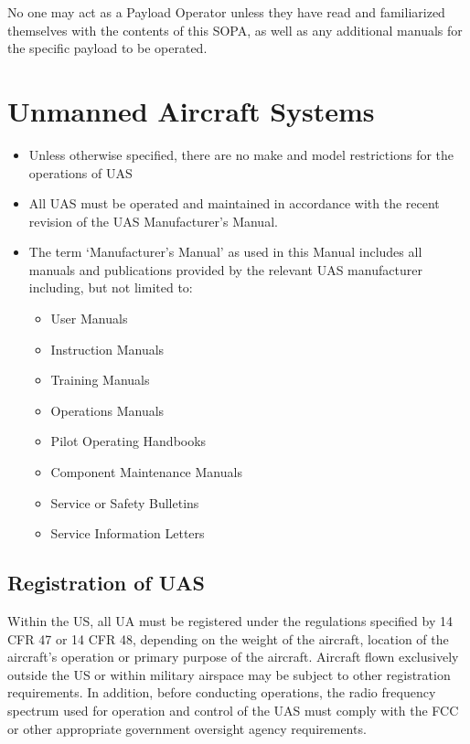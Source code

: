 \documentclass[
]{book}
\providecommand{\tightlist}{%
  \setlength{\itemsep}{0pt}\setlength{\parskip}{0pt}}
\begin{document}
No one may act as a Payload Operator unless they have read and familiarized themselves with the contents of this SOPA, as well as any additional manuals for the specific payload to be operated.

\chapter{Unmanned Aircraft Systems}\label{ch-UAS}

\begin{itemize}
\item
  Unless otherwise specified, there are no make and model restrictions for the operations of UAS
\item
  All UAS must be operated and maintained in accordance with the recent revision of the UAS Manufacturer's Manual.
\item
  The term `Manufacturer's Manual' as used in this Manual includes all manuals and publications provided by the relevant UAS manufacturer including, but not limited to:

  \begin{itemize}
  \tightlist
  \item
    User Manuals
  \item
    Instruction Manuals
  \item
    Training Manuals
  \item
    Operations Manuals
  \item
    Pilot Operating Handbooks
  \item
    Component Maintenance Manuals
  \item
    Service or Safety Bulletins
  \item
    Service Information Letters
  \end{itemize}
\end{itemize}

\section{Registration of UAS}\label{registration-of-uas}

Within the US, all UA must be registered under the regulations specified by 14 CFR 47 or 14 CFR 48, depending on the weight of the aircraft, location of the aircraft's operation or primary purpose of the aircraft. Aircraft flown exclusively outside the US or within military airspace may be subject to other registration requirements. In addition, before conducting operations, the radio frequency spectrum used for operation and control of the UAS must comply with the FCC or other appropriate government oversight agency requirements.
\end{document}
